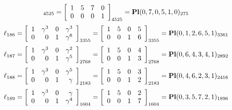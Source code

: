 \documentclass{article}
\begin{document}
{$$_{4525}
=
\left[
\begin{array}{*{4}c}
1  & 5  & 7  & 0\\
0  & 0  & 0  & 1\\
\end{array}
\right]_{4525}
={\rm\bf Pl}(0,7,0,5,1,0 )_{275}$$
$$
\ell_{186} = 
\left[
\begin{array}{*{4}{r}}
1 & \gamma^{3} & 0 & \gamma^{3}\\
0 & 0 & 1 & \gamma^{6}\\
\end{array}
\right]
_{3355}
=
\left[
\begin{array}{*{4}c}
1  & 5  & 0  & 5\\
0  & 0  & 1  & 6\\
\end{array}
\right]_{3355}
={\rm\bf Pl}(0,1,2,6,5,1 )_{3361}$$
$$
\ell_{187} = 
\left[
\begin{array}{*{4}{r}}
1 & \gamma^{3} & 0 & \gamma^{2}\\
0 & 0 & 1 & \gamma^{5}\\
\end{array}
\right]
_{2768}
=
\left[
\begin{array}{*{4}c}
1  & 5  & 0  & 4\\
0  & 0  & 1  & 3\\
\end{array}
\right]_{2768}
={\rm\bf Pl}(0,6,4,3,4,1 )_{2892}$$
$$
\ell_{188} = 
\left[
\begin{array}{*{4}{r}}
1 & \gamma^{3} & 0 & \gamma^{5}\\
0 & 0 & 1 & \gamma \\
\end{array}
\right]
_{2183}
=
\left[
\begin{array}{*{4}c}
1  & 5  & 0  & 3\\
0  & 0  & 1  & 2\\
\end{array}
\right]_{2183}
={\rm\bf Pl}(0,4,6,2,3,1 )_{2416}$$
$$
\ell_{189} = 
\left[
\begin{array}{*{4}{r}}
1 & \gamma^{3} & 0 & \gamma \\
0 & 0 & 1 & \gamma^{4}\\
\end{array}
\right]
_{1604}
=
\left[
\begin{array}{*{4}c}
1  & 5  & 0  & 2\\
0  & 0  & 1  & 7\\
\end{array}
\right]_{1604}
={\rm\bf Pl}(0,3,5,7,2,1 )_{1896}$$
}
\end{document}
